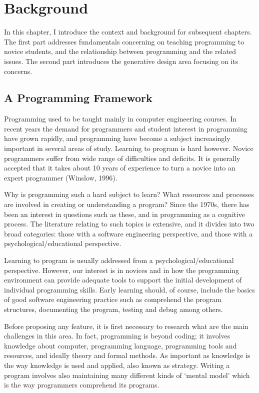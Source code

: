 
\chapter{Background}
\label{chapter:background}

In this chapter, I introduce the context and background for subsequent chapters. The first part addresses fundamentals concerning on teaching programming to novice students, and the relationship between programming and the related issues. The second part introduces the generative design area focusing on its concerns.

\section{A Programming Framework}

Programming used to be taught mainly in computer engineering courses. In recent years the demand for programmers and student interest in programming have grown rapidly, and programming have become a subject increasingly important in several areas of study. Learning to program is hard however. Novice programmers suffer from wide range of difficulties and deficits. It is generally accepted that it takes about 10 years of experience to turn a novice into an expert programmer (Winslow, 1996).

Why is programming such a hard subject to learn? What resources and processes are involved in creating or understanding a program? Since the 1970s, there has been an interest in questions such as these, and in programming as a cognitive process. The literature relating to such topics is extensive, and it divides into two broad categories: those with a software engineering perspective, and those with a psychological/educational perspective.

Learning to program is usually addressed from a psychological/educational perspective. However, our interest is in novices and in how the programming environment can provide adequate tools to support the initial development of individual programming skills. Early learning should, of course, include the basics of good software engineering practice such as comprehend the program structures, documenting the program, testing and debug among others.

Before proposing any feature, it is first necessary to research what are the main challenges in this area. In fact, programming is beyond coding; it involves knowledge about computer, programming language, programming tools and resources, and ideally theory and formal methods. As important as knowledge is the way knowledge is used and applied, also known as strategy. Writing a program involves also maintaining many different kinds of ‘mental model’ which is the way programmers comprehend its programs.

